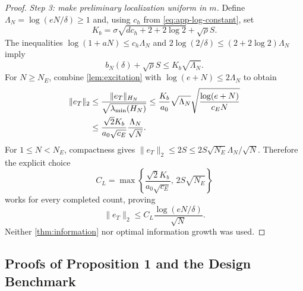 \documentclass[10pt,twoside,letterpaper]{article}
\newcommand{\norm}[1]{\lVert #1\rVert}
\begin{document}
\begin{proof}
\textit{Step 3: make preliminary localization uniform in $m$.}
Define $\Lambda_N=\log(eN/\delta)\ge1$ and, using $c_h$ from
\eqref{eq:app-log-constant}, set
\begin{equation}
K_b=\sigma\sqrt{dc_h+2+2\log2}+\sqrt\rho S.
\label{eq:app-radius-constant}
\end{equation}
The inequalities $\log(1+aN)\le c_h\Lambda_N$ and
$2\log(2/\delta)\le(2+2\log2)\Lambda_N$ imply
\begin{equation}
b_N(\delta)+\sqrt\rho S\le K_b\sqrt{\Lambda_N}.
\label{eq:app-radius-log-control}
\end{equation}
For $N\ge N_E$, combine \cref{lem:excitation} with
$\log(e+N)\le2\Lambda_N$ to obtain
\begin{align}
\norm{e_T}_2
&\le\frac{\norm{e_T}_{H_N}}{\sqrt{\lambda_{\min}(H_N)}}
\le\frac{K_b}{a_0}\sqrt{\Lambda_N}
\sqrt{\frac{\log(e+N)}{c_EN}}\notag\\
&\le\frac{\sqrt2K_b}{a_0\sqrt{c_E}}
\frac{\Lambda_N}{\sqrt N}.
\label{eq:app-large-count-localization}
\end{align}
For $1\le N<N_E$, compactness gives
$\norm{e_T}_2\le2S\le2S\sqrt{N_E}\Lambda_N/\sqrt N$.
Therefore the explicit choice
\begin{equation}
C_L=\max\left\{\frac{\sqrt2K_b}{a_0\sqrt{c_E}},\,
2S\sqrt{N_E}\right\}
\label{eq:app-localization-constant}
\end{equation}
works for every completed count, proving
\begin{equation}
\norm{e_T}_2\le C_L\frac{\log(eN/\delta)}{\sqrt N}.
\label{eq:app-preliminary-localization}
\end{equation}
Neither \cref{thm:information} nor optimal information growth was used.
\end{proof}

\subsection{Proofs of Proposition 1 and the Design Benchmark}
\label{app:ceiling}
\end{document}
